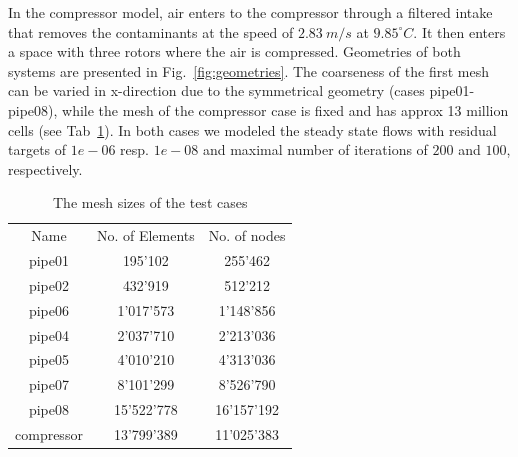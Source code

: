 \documentclass[3p,times]{elsarticle}
\begin{document}
In the compressor model, air enters to the compressor through a filtered intake that removes the contaminants at the speed of $2.83\ m/s$ at $9.85 ^\circ C$. It then enters a space with three rotors where the air is compressed. Geometries of both systems are presented in Fig.~\ref{fig:geometries}. 
The coarseness of the first mesh can be varied  in x-direction due to the symmetrical geometry (cases pipe01-pipe08), while the mesh of the compressor case is fixed and has approx 13 million cells (see Tab~\ref{tab:MeshSize}). In both cases we modeled the steady state flows with residual targets of $1e-06$ resp. $1e-08$ and maximal number of iterations of $200$ and $100$, respectively. 

\begin{table}
	\centering
		\begin{tabular} {|c|c|c|}
			\hline
			Name & No. of Elements & No. of nodes \\			
			pipe01 & 195'102 & 255'462 \\ \hline
			pipe02 & 432'919 & 512'212 \\ \hline
			pipe06 & 1'017'573 & 1'148'856 \\ \hline
			pipe04 & 2'037'710 & 2'213'036 \\ \hline
			pipe05 & 4'010'210 & 4'313'036 \\ \hline			
			pipe07 & 8'101'299 & 8'526'790 \\ \hline
			pipe08 & 15'522'778 & 16'157'192 \\ \hline
			compressor & 13'799'389  & 11'025'383 \\ \hline
		\end{tabular}
	\caption{The mesh sizes of the test cases}
	\label{tab:MeshSize}
\end{table}
\end{document}
